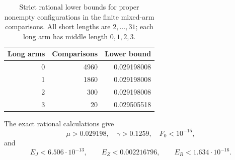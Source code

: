 \begin{table}[ht]
\centering
\caption{Strict rational lower bounds for proper nonempty configurations
in the finite mixed-arm comparisons. All short lengths are $2,\ldots,31$;
each long arm has middle length $0,1,2,3$.}
\label{spider:table}
\begin{tabular}{rrr}
\toprule
Long arms & Comparisons & Lower bound \\
\midrule
0 & 4960 & 0.029198008 \\
1 & 1860 & 0.029198008 \\
2 & 300 & 0.029198008 \\
3 & 20 & 0.029505518 \\
\bottomrule
\end{tabular}
\end{table}
The exact rational calculations give
\[
 \mu>0.029198,\quad \gamma>0.1259,\quad F_0<10^{-15},
\]
and
\[
 E_J<6.506\cdot10^{-13},\qquad
 E_Z<0.002216796,\qquad E_R<1.634\cdot10^{-16}.
\]
